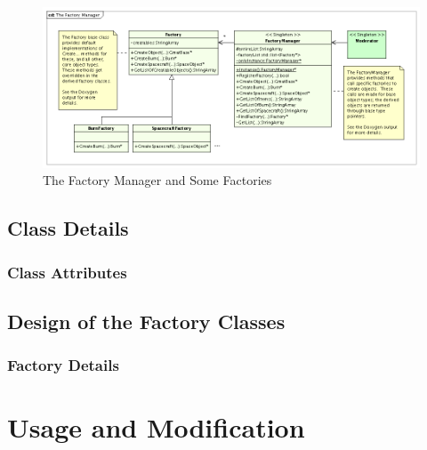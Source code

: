 \begin{figure}[htb]
\begin{center}
\includegraphics[460,197]{Images/TheFactoryManager.png}
\caption{The Factory Manager and Some Factories}
\label{figure:FactManClassDiagram}
\end{center}
\end{figure}



\subsection{Class Details}

\subsubsection{Class Attributes}

\subsection{\label{section:FactoryClassDesign}Design of the Factory Classes}

\subsubsection{Factory Details}


\section{Usage and Modification}

